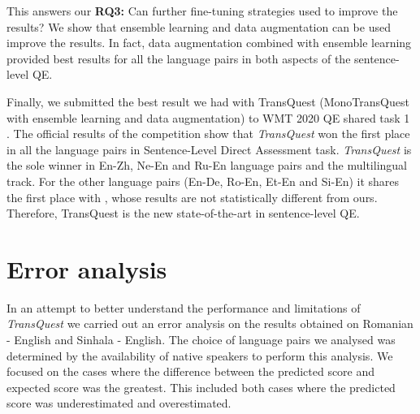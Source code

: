 This answers our \textbf{RQ3:} Can further fine-tuning strategies used to improve the results? We show that ensemble learning and 
data augmentation can be used improve the results. In fact, data augmentation combined with ensemble learning provided best results for all the language pairs in both aspects of the sentence-level QE. 

Finally, we submitted the best result we had with TransQuest (MonoTransQuest with ensemble learning and data augmentation) to WMT 2020 QE shared task 1 \autocite{specia-etal-2020-findings-wmt}. The official results of the competition show that \textit{TransQuest} won the first place in all the language pairs in Sentence-Level Direct Assessment task. \textit{TransQuest} is the sole winner in En-Zh, Ne-En and Ru-En language pairs and the multilingual track. For the other language pairs (En-De, Ro-En, Et-En and Si-En) it shares the first place with \autocite{fomicheva-etal-2020-bergamot}, whose results are not statistically different from ours. Therefore, TransQuest is the new state-of-the-art in sentence-level QE.

\section{Error analysis}
\label{sec:transquest_error}

In an attempt to better understand the performance and limitations of \textit{TransQuest} we carried out an error analysis on the results obtained on Romanian - English and Sinhala - English. The choice of language pairs we analysed was determined by the availability of native speakers to perform this analysis. We focused on the cases where the difference between the predicted score and expected score was the greatest. This included both cases where the predicted score was underestimated and overestimated. 

